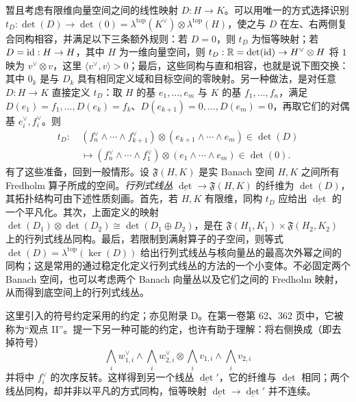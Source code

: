 暂且考虑有限维向量空间之间的线性映射 $D:H\to K$。可以用唯一的方式选择识别 $t_D:\det(D)\to\det(0)=\lambda^{\mathrm{top}}(K^\vee)\otimes\lambda^{\mathrm{top}}(H)$，使之与 $D$ 在左、右两侧复合同构相容，并满足以下三条额外规则：若 $D=0$，则 $t_D$ 为恒等映射；若 $D=\operatorname{id}:H\to H$，其中 $H$ 为一维向量空间，则 $t_D:\mathbb R=\det(\operatorname{id})\to H^\vee\otimes H$ 将 $1$ 映为 $v^\vee\otimes v$，这里 $\langle v^\vee,\allowbreak v\rangle>0$；最后，这些同构与直和相容，也就是说下图交换：
其中 $0_k$ 是与 $D_k$ 具有相同定义域和目标空间的零映射。另一种做法，是对任意 $D:H\to K$ 直接定义 $t_D$：取 $H$ 的基 $e_1,\allowbreak \ldots,\allowbreak e_m$ 与 $K$ 的基 $f_1,\allowbreak \ldots,\allowbreak f_n$，满足 $D(e_1)=f_1,\allowbreak \ldots,\allowbreak D(e_k)=f_k$、$D(e_{k+1})=0,\allowbreak \ldots,\allowbreak D(e_m)=0$，再取它们的对偶基 $e_i^\vee,\allowbreak f_i^\vee$。则
\begin{equation}\label{eq:11.3}
\begin{aligned}
t_D:\ &(f_n^\vee\wedge\cdots\wedge f_{k+1}^\vee)\otimes(e_{k+1}\wedge\cdots\wedge e_m)\in\det(D)\\
&\longmapsto(f_n^\vee\wedge\cdots\wedge f_1^\vee)\otimes(e_1\wedge\cdots\wedge e_m)\in\det(0).
\end{aligned}
\end{equation}
有了这些准备，回到一般情形。设 $\mathfrak F(H,\allowbreak K)$ 是实 Banach 空间 $H,\allowbreak K$ 之间所有 Fredholm 算子所成的空间。\emph{行列式线丛} $\underline{\det}\to\mathfrak F(H,\allowbreak K)$ 的纤维为 $\det(D)$，其拓扑结构可由下述性质刻画。首先，若 $H,\allowbreak K$ 有限维，同构 $t_D$ 应给出 $\underline{\det}$ 的一个平凡化。其次，上面定义的映射
$\det(D_1)\otimes\det(D_2)\cong\det(D_1\oplus D_2)$，是在 $\mathfrak F(H_1,\allowbreak K_1)\times\mathfrak F(H_2,\allowbreak K_2)$ 上的行列式线丛同构。最后，若限制到满射算子的子空间，则等式 $\det(D)=\lambda^{\mathrm{top}}(\ker(D))$ 给出行列式线丛与核向量丛的最高次外幂之间的同构；这是常用的通过稳定化定义行列式线丛的方法的一个小变体。不必固定两个 Banach 空间，也可以考虑两个 Banach 向量丛以及它们之间的 Fredholm 映射，从而得到底空间上的行列式线丛。
\begin{note}\label{st:11.1}
这里引入的符号约定采用的约定；亦见附录 D。在第一卷第 62、362 页中，它被称为“观点 II”。提一下另一种可能的约定，也许有助于理解：将右侧换成（即去掉符号）
\[
\bigwedge_iw_{1,i}^\vee\wedge\bigwedge_iw_{2,i}^\vee\otimes\bigwedge_iv_{1,i}\wedge\bigwedge_iv_{2,i}
\]
并将中 $f_i^\vee$ 的次序反转。这样得到另一个线丛 $\underline{\det}'$，它的纤维与 $\underline{\det}$ 相同；两个线丛同构，却并非以平凡的方式同构，恒等映射 $\underline{\det}\to\underline{\det}'$ 并不连续。
\end{note}
